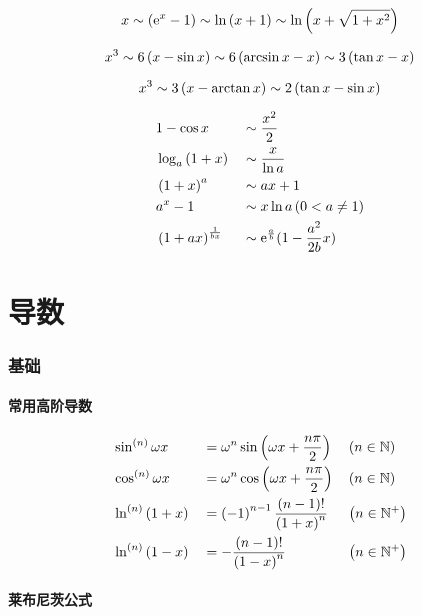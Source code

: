 \documentclass{article}
\begin{document}
\[x\sim\left(\mathrm e^x-1\right)\sim\ln\left(x+1\right)\sim\ln\left(x+\sqrt{1+x^2}\right)\]

\[x^3\sim6\left(x-\sin x\right)\sim6\left(\arcsin x-x\right)\sim3\left(\tan x-x\right)\]

\[x^3\sim3\left(x-\arctan x\right)\sim2\left(\tan x -\sin x\right)\]

\[\begin{aligned}
         & 1-\cos x            &  & \sim\frac{x^2}2                    \\
         & \log_a{\left(1+x\right)}     &  & \sim\frac x{\ln a}                 \\
         & \left(1+x\right)^a           &  & \sim ax+1                          \\
         & a^x-1               &  & \sim x\ln a\left(0<a\neq1\right)            \\
         & \left(1+ax\right)^\frac1{bx} &  & \sim\mathrm e^\frac ab(1-\frac{a^2}{2b}x) \\
    \end{aligned}\]

\part{导数}

\section{基础}

\subsection{常用高阶导数}

\[\begin{aligned}
         & \sin^{\left(n\right)}\omega x &  & =\omega^n\sin\left(\omega x+\frac{n\pi}2\right)   &  & \left(n\in\mathbb N\right)  \\
         & \cos^{\left(n\right)}\omega x &  & =\omega^n\cos{\left(\omega x+\frac{n\pi}2\right)} &  & \left(n\in\mathbb N\right)  \\
         & \ln^{\left(n\right)}\left(1+x\right)   &  & =\left(-1\right)^{n-1}\frac{\left(n-1\right)!}{\left(1+x\right)^n}  &  & \left(n\in\mathbb N^+\right) \\
         & \ln^{\left(n\right)}\left(1-x\right)   &  & =-\frac{\left(n-1\right)!}{\left(1-x\right)^n}             &  & \left(n\in\mathbb N^+\right) \\
    \end{aligned}\]

\subsection{莱布尼茨公式}
\end{document}
